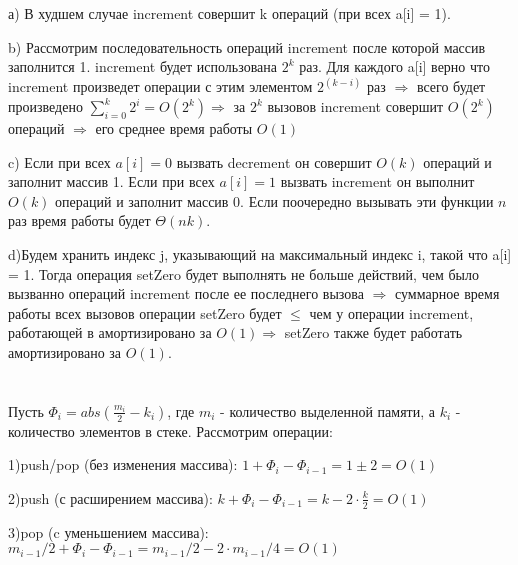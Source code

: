 \documentclass{article}
\begin{document}
\begin{flushleft}
\section{}

а) В худшем случае increment совершит k операций (при всех a[i] = 1).

b) Рассмотрим последовательность операций increment после которой массив заполнится 1. increment будет использована $2^k$ раз. Для каждого a[i] верно что increment произведет операции с этим элементом $2^{(k - i)}$ раз $\Rightarrow$ всего будет произведено $\sum\limits_{i = 0}^{k}{2^i} = O(2^k) \Rightarrow$ за $2^k$ вызовов increment совершит $O(2^k)$ операций $\Rightarrow$ его среднее время работы $O(1)$

c) Если при всех $a[i] = 0$ вызвать decrement он совершит $O(k)$ операций и заполнит массив 1. Если при всех $a[i] = 1$ вызвать increment он выполнит $O(k)$ операций и заполнит массив 0. Если поочередно вызывать эти функции $n$ раз время работы будет $\Theta(nk)$.

d)Будем хранить индекс j, указывающий на максимальный индекс i, такой что a[i] = 1. Тогда операция setZero будет выполнять не больше действий, чем было вызванно операций increment после ее последнего вызова $\Rightarrow$ суммарное время работы всех вызовов операции setZero будет $\le$ чем у операции increment, работающей в амортизировано за $O(1) \Rightarrow$ setZero также будет работать амортизировано за $O(1)$.

\section{}

Пусть $\Phi_i = abs(\frac{m_i}{2} - k_i)$, где $m_i$ - количество выделенной памяти, а $k_i$ - количество элементов в стеке. Рассмотрим операции: 

1)push/pop (без изменения массива): $1 + \Phi_i - \Phi_{i - 1} = 1 \pm 2 = O(1)$

2)push (с расширением массива): $k + \Phi_i - \Phi_{i - 1} = k - 2 \cdot \frac{k}{2} = O(1)$

3)pop (c уменьшением массива): $m_{i - 1} / 2 + \Phi_i - \Phi_{i - 1} = m_{i - 1} / 2 - 2 \cdot m_{i - 1} / 4 = O(1)$

\section{}


\end{flushleft}
\end{document}
